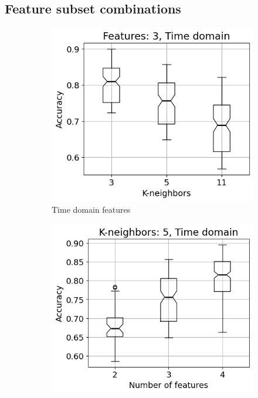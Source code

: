 \subsection{Feature subset combinations}
\begin{figure}[h]
    \centering
    \begin{subfigure}[b]{0.48\textwidth}
        \includegraphics[width=\textwidth]{assets/results/feature-combinations/TD-3-A-False-False-F3.png}
        \caption{Time domain features}
    \end{subfigure}
    \hfill
    \begin{subfigure}[b]{0.48\textwidth}
        \includegraphics[width=\textwidth]{assets/results/feature-combinations/TD-3-A-False-False-K5.png}

\end{subfigure}
\end{figure}
